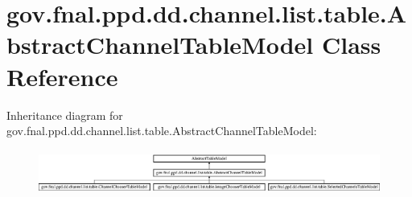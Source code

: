 \hypertarget{classgov_1_1fnal_1_1ppd_1_1dd_1_1channel_1_1list_1_1table_1_1AbstractChannelTableModel}{\section{gov.\-fnal.\-ppd.\-dd.\-channel.\-list.\-table.\-Abstract\-Channel\-Table\-Model Class Reference}
\label{classgov_1_1fnal_1_1ppd_1_1dd_1_1channel_1_1list_1_1table_1_1AbstractChannelTableModel}
}
Inheritance diagram for gov.\-fnal.\-ppd.\-dd.\-channel.\-list.\-table.\-Abstract\-Channel\-Table\-Model\-:\begin{figure}[H]
\begin{center}
\leavevmode
\includegraphics[height=1.473684cm]{classgov_1_1fnal_1_1ppd_1_1dd_1_1channel_1_1list_1_1table_1_1AbstractChannelTableModel}
\end{center}
\end{figure}
